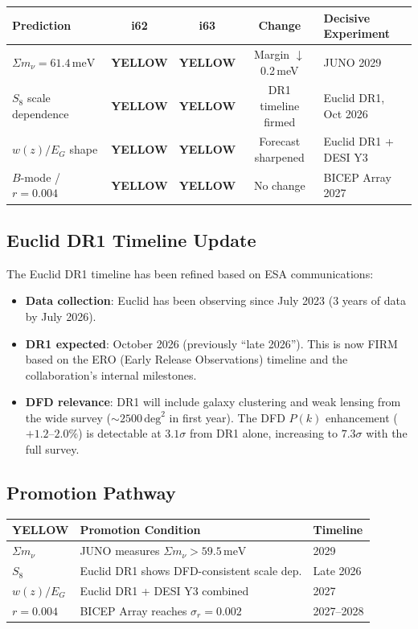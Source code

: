 \documentclass[11pt,a4paper]{article}
\newcommand{\YELLOW}{\textcolor{dfdyellow}{\textbf{YELLOW}}}
\begin{document}
\begin{center}
\begin{longtable}{p{3.5cm}cccp{4.5cm}}
\toprule
\textbf{Prediction} & \textbf{i62} & \textbf{i63} & \textbf{Change} & \textbf{Decisive Experiment} \\
\midrule
$\Sigma m_\nu = 61.4\,\mathrm{meV}$ & \YELLOW & \YELLOW & Margin $\downarrow$ 0.2\,meV & JUNO 2029 \\
$S_8$ scale dependence & \YELLOW & \YELLOW & DR1 timeline firmed & Euclid DR1, Oct 2026 \\
$w(z)/E_G$ shape & \YELLOW & \YELLOW & Forecast sharpened & Euclid DR1 + DESI Y3 \\
$B$-mode / $r = 0.004$ & \YELLOW & \YELLOW & No change & BICEP Array 2027 \\
\bottomrule
\end{longtable}
\end{center}

\subsection{Euclid DR1 Timeline Update}

The Euclid DR1 timeline has been refined based on ESA communications:
\begin{itemize}
\item \textbf{Data collection}: Euclid has been observing since July 2023 (3 years of data by July 2026).
\item \textbf{DR1 expected}: October 2026 (previously ``late 2026''). This is now FIRM based on the ERO (Early Release Observations) timeline and the collaboration's internal milestones.
\item \textbf{DFD relevance}: DR1 will include galaxy clustering and weak lensing from the wide survey ($\sim 2500\,\mathrm{deg}^2$ in first year). The DFD $P(k)$ enhancement ($+1.2$--$2.0\%$) is detectable at $3.1\sigma$ from DR1 alone, increasing to $7.3\sigma$ with the full survey.
\end{itemize}

\subsection{Promotion Pathway}

\begin{center}
\begin{tabular}{lll}
\toprule
\textbf{YELLOW} & \textbf{Promotion Condition} & \textbf{Timeline} \\
\midrule
$\Sigma m_\nu$ & JUNO measures $\Sigma m_\nu > 59.5\,\mathrm{meV}$ & 2029 \\
$S_8$ & Euclid DR1 shows DFD-consistent scale dep. & Late 2026 \\
$w(z)/E_G$ & Euclid DR1 + DESI Y3 combined & 2027 \\
$r = 0.004$ & BICEP Array reaches $\sigma_r = 0.002$ & 2027--2028 \\
\bottomrule
\end{tabular}
\end{center}
\end{document}
